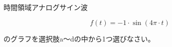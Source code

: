 時間領域アナログサイン波

\[
f(t) = -1 \cdot \sin( 4 \pi \cdot t )
\]

\bigskip
\noindent  のグラフを選択肢a〜dの中から1つ選びなさい。
